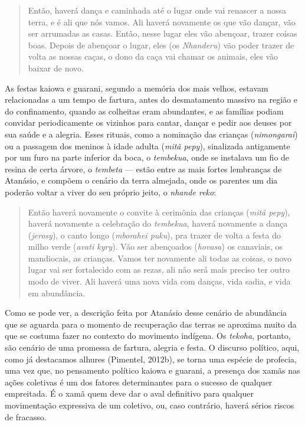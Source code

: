 \begin{quotation}
Então, haverá dança e caminhada até o lugar onde vai renascer a nossa
terra, e é ali que nós vamos. Ali haverá novamente os que vão dançar,
vão ser arrumadas as casas. Então, nesse lugar eles vão abençoar,
trazer coisas boas. Depois de abençoar o lugar, eles (os \emph{Nhanderu}) vão
poder trazer de volta as nossas caças, o dono da caça vai chamar os
animais, eles vão baixar de novo.
\end{quotation}

As festas kaiowa e guarani, segundo a memória dos mais velhos, estavam
relacionadas a um tempo de fartura, antes do desmatamento massivo na
região e do confinamento, quando as colheitas eram abundantes, e as
famílias podiam convidar periodicamente os vizinhos para cantar, dançar
e pedir aos deuses por sua saúde e a alegria. Esses rituais, como a
nominação das crianças (\emph{nimongarai}) ou a passagem dos meninos à idade
adulta (\emph{mitã pepy}), sinalizada antigamente por um furo na parte
inferior da boca, o \emph{tembekua}, onde se instalava um fio de resina de
certa árvore, o \emph{tembeta} --- estão entre as mais fortes lembranças de
Atanásio, e compõem o cenário da terra almejada, onde os parentes um
dia poderão voltar a viver do seu próprio jeito, o \emph{nhande reko}:

\begin{quotation}
Então haverá novamente o convite à cerimônia das crianças (\emph{mitã pepy}),
haverá novamente a celebração do \emph{tembekua}, haverá novamente a dança
(\emph{jerosy}), o canto longo (\emph{mborahei puku}), pra trazer de volta a festa do
milho verde (\emph{avati kyry}). Vão ser abençoados (\emph{hovasa}) os canaviais, os
mandiocais, as crianças. Vamos ter novamente ali todas as coisas, o
novo lugar vai ser fortalecido com as rezas, ali não será mais preciso
ter outro modo de viver. Ali haverá uma nova vida com danças, vida
sadia, e vida em abundância.
\end{quotation}

Como se pode ver, a descrição feita por Atanásio desse cenário de
abundância que se aguarda para o momento de recuperação das terras se
aproxima muito da que se costuma fazer no contexto do movimento
indígena. Os \emph{tekoha}, portanto, são cenário de uma promessa de fartura,
alegria e festa. O discurso político, aqui, como já destacamos alhures
(Pimentel, 2012b), se torna uma espécie de profecia, uma vez que, no
pensamento político kaiowa e guarani, a presença dos xamãs nas ações
coletivas é um dos fatores determinantes para o sucesso de qualquer
empreitada. É o xamã quem deve dar o aval definitivo para qualquer
movimentação expressiva de um coletivo, ou, caso contrário, haverá
sérios riscos de fracasso. 

